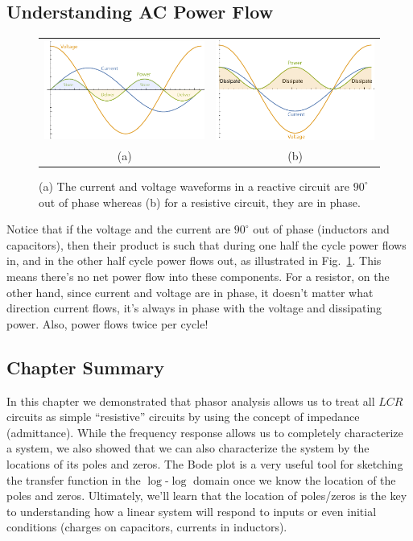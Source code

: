 \subsection{Understanding AC Power Flow}
\begin{figure}[tb]
\centering
\begin{tabular}{cc}
\includegraphics[width=.45\columnwidth]{cap_power} &
\includegraphics[width=.45\columnwidth]{res_power}\\
(a) & (b)\\
\end{tabular}
\caption{(a) The current and voltage waveforms in a reactive circuit are $90^\circ$ out of phase whereas (b) for a resistive circuit, they are in phase.}
\label{fig:powerflow}
\end{figure}
Notice that if the voltage and the current are $90^\circ$ out of phase (inductors and capacitors), then their product is such that during one half the cycle power flows in, and in the other half cycle power flows out, as illustrated in Fig.~\ref{fig:powerflow}.  This means there's no net power flow into these components.  For a resistor, on the other hand, since current and voltage are in phase, it doesn't matter what direction current flows, it's always in phase with the voltage and dissipating power.  Also, power flows twice per cycle!
\subsection{Chapter Summary}
In this chapter we demonstrated that phasor analysis allows us to treat all $LCR$ circuits as simple “resistive” circuits by using the concept of impedance (admittance).  While the frequency response allows us to completely characterize a system, we also showed that we can also characterize the system by the locations of its poles and zeros.  The Bode plot is a very useful tool for sketching the transfer function in the $\log$-$\log$ domain once we know the location of the poles and zeros.  Ultimately, we'll learn that the location of poles/zeros is the key to understanding how a linear system will respond to inputs or even initial conditions (charges on capacitors, currents in inductors).
